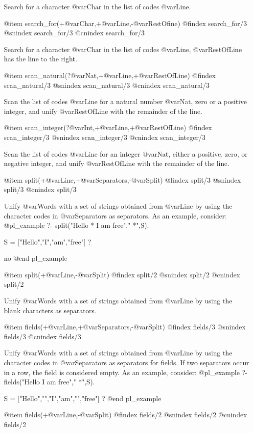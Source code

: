 Search for a character @var{Char} in the list of codes @var{Line}.

@item search_for(+@var{Char},+@var{Line},-@var{RestOfine})
@findex search_for/3
@snindex search_for/3
@cnindex search_for/3

Search for a character @var{Char} in the list of codes @var{Line},
@var{RestOfLine} has the line to the right.

@item scan_natural(?@var{Nat},+@var{Line},+@var{RestOfLine})
@findex scan_natural/3
@snindex scan_natural/3
@cnindex scan_natural/3

Scan the list of codes @var{Line} for a natural number @var{Nat}, zero
or a positive integer, and unify @var{RestOfLine} with the remainder
of the line.

@item scan_integer(?@var{Int},+@var{Line},+@var{RestOfLine})
@findex scan_integer/3
@snindex scan_integer/3
@cnindex scan_integer/3

Scan the list of codes @var{Line} for an integer @var{Nat}, either a
positive, zero, or negative integer, and unify @var{RestOfLine} with
the remainder of the line.

@item split(+@var{Line},+@var{Separators},-@var{Split})
@findex split/3
@snindex split/3
@cnindex split/3

Unify @var{Words} with a set of strings obtained from @var{Line} by
using the character codes in @var{Separators} as separators. As an
example, consider:
@pl_example
?- split("Hello * I am free"," *",S).

S = ["Hello","I","am","free"] ?

no
@end pl_example

@item split(+@var{Line},-@var{Split})
@findex split/2
@snindex split/2
@cnindex split/2

Unify @var{Words} with a set of strings obtained from @var{Line} by
using the blank characters  as separators.

@item fields(+@var{Line},+@var{Separators},-@var{Split})
@findex fields/3
@snindex fields/3
@cnindex fields/3

Unify @var{Words} with a set of strings obtained from @var{Line} by
using the character codes in @var{Separators} as separators for
fields. If two separators occur in a row, the field is considered
empty. As an example, consider:
@pl_example
?- fields("Hello  I am  free"," *",S).

S = ["Hello","","I","am","","free"] ?
@end pl_example

@item fields(+@var{Line},-@var{Split})
@findex fields/2
@snindex fields/2
@cnindex fields/2

